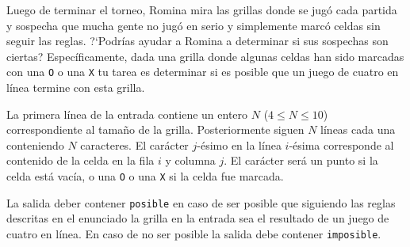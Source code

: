 \documentclass{oci}
\begin{document}
\begin{problemDescription}
\begin{center}
  \end{center}

  Luego de terminar el torneo, Romina mira
  las grillas donde se jugó cada partida
  y sospecha que mucha gente no jugó en serio y
  simplemente marcó celdas sin seguir las reglas.
  ?`Podrías ayudar a Romina a determinar si sus sospechas
  son ciertas?
  Específicamente, dada una grilla donde algunas
  celdas han sido marcadas con una \texttt{O} o una \texttt{X}
  tu tarea es determinar si es posible que un juego de cuatro en
  línea termine con esta grilla.
\end{problemDescription}

\begin{inputDescription}
  La primera línea de la entrada contiene un entero $N$ ($4\leq N \leq 10$)
  correspondiente
  al tamaño de la grilla.
  Posteriormente siguen $N$ líneas cada una conteniendo $N$ caracteres.
  El carácter $j$-ésimo en la línea $i$-ésima corresponde al contenido
  de la celda en la fila $i$ y columna $j$.
  El carácter será un punto si la celda está vacía, o
  una \texttt{O} o una \texttt{X} si la celda fue marcada.
\end{inputDescription}

\begin{outputDescription}
  La salida deber contener \texttt{posible} en caso de ser posible
  que siguiendo las reglas descritas en el enunciado la grilla en la
  entrada sea el resultado de un juego de cuatro en línea.
  En caso de no ser posible la salida debe contener \texttt{imposible}.
\end{outputDescription}
\end{document}
